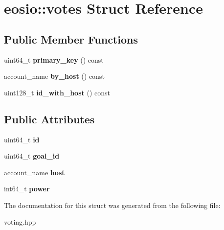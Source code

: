 \hypertarget{structeosio_1_1votes}{}\section{eosio\+:\+:votes Struct Reference}
\label{structeosio_1_1votes}
\subsection*{Public Member Functions}
\begin{DoxyCompactItemize}
\item 
\mbox{\label{structeosio_1_1votes_ae77211beb2cabd6b8cf5bf1fd48ab1ad}} 
uint64\+\_\+t {\bfseries primary\+\_\+key} () const
\item 
\mbox{\label{structeosio_1_1votes_aa8382302b8f3db0de182af73b7a7d4c6}} 
account\+\_\+name {\bfseries by\+\_\+host} () const
\item 
\mbox{\label{structeosio_1_1votes_a8db493f978427a54f36d83b29c188a84}} 
uint128\+\_\+t {\bfseries id\+\_\+with\+\_\+host} () const
\end{DoxyCompactItemize}
\subsection*{Public Attributes}
\begin{DoxyCompactItemize}
\item 
\mbox{\label{structeosio_1_1votes_a3f9015b0bc3aa4d49f89770b1b123108}} 
uint64\+\_\+t {\bfseries id}
\item 
\mbox{\label{structeosio_1_1votes_a429610e81636e333de9272c08b58e630}} 
uint64\+\_\+t {\bfseries goal\+\_\+id}
\item 
\mbox{\label{structeosio_1_1votes_a68474af393100808fb5b4c314df7a0d9}} 
account\+\_\+name {\bfseries host}
\item 
\mbox{\label{structeosio_1_1votes_a7342aab3f84b616a2a5a81bf629648f9}} 
int64\+\_\+t {\bfseries power}
\end{DoxyCompactItemize}


The documentation for this struct was generated from the following file\+:\begin{DoxyCompactItemize}
\item 
voting.\+hpp\end{DoxyCompactItemize}
